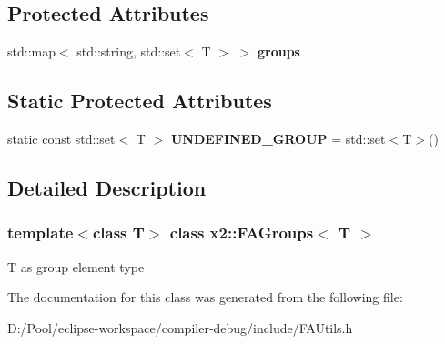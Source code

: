 \subsection*{Protected Attributes}
\begin{DoxyCompactItemize}
\item 
\mbox{\label{classx2_1_1_f_a_groups_a5c5e18182fce69e70ed81937bbcae877}} 
std\+::map$<$ std\+::string, std\+::set$<$ T $>$ $>$ {\bfseries groups}
\end{DoxyCompactItemize}
\subsection*{Static Protected Attributes}
\begin{DoxyCompactItemize}
\item 
\mbox{\label{classx2_1_1_f_a_groups_a9836c66d59da2c3d1e25811b608f6cc9}} 
static const std\+::set$<$ T $>$ {\bfseries U\+N\+D\+E\+F\+I\+N\+E\+D\+\_\+\+G\+R\+O\+UP} = std\+::set$<$T$>$()
\end{DoxyCompactItemize}


\subsection{Detailed Description}
\subsubsection*{template$<$class T$>$\newline
class x2\+::\+F\+A\+Groups$<$ T $>$}

T as group element type 

The documentation for this class was generated from the following file\+:\begin{DoxyCompactItemize}
\item 
D\+:/\+Pool/eclipse-\/workspace/compiler-\/debug/include/F\+A\+Utils.\+h\end{DoxyCompactItemize}
